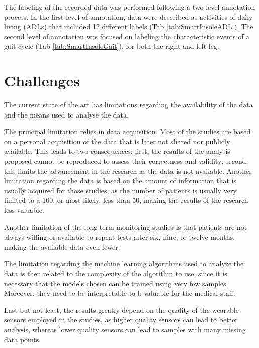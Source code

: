 The labeling of the recorded data was performed following a two-level annotation process. In the first level of annotation, data were described as activities of daily living (ADLs) that included 12 different labels (Tab \ref{tab:SmartInsoleADL}). The second level of annotation was focused on labeling the characteristic events of a gait cycle (Tab \ref{tab:SmartInsoleGait}), for both the right and left leg. 

\FloatBarrier


\FloatBarrier
\section{Challenges}
The current state of the art has limitations regarding the availability of the data and the means used to analyse the data.

The principal limitation relies in data acquisition. Most of the studies are based on a personal acquisition of the data that is later not shared nor publicly available. This leads to two consequences: first, the results of the analysis proposed cannot be reproduced to assess their correctness and validity; second, this limits the advancement in the research as the data is not available.
Another limitation regarding the data is based on the amount of information that is usually acquired for those studies, as the number of patients is usually very limited to a 100, or most likely, less than 50, making the results of the research less valuable.

Another limitation of the long term monitoring studies is that patients are not always willing or available to repeat tests after six, nine, or twelve months, making the available data even fewer. 

The limitation regarding the machine learning algorithms used to analyze the data is then related to the complexity of the algorithm to use, since it is necessary that the models chosen can be trained using very few samples. Moreover, they need to be interpretable to b valuable for the medical staff.

Last but not least, the results greatly depend on the quality of the wearable sensors employed in the studies, as higher quality sensors can lead to better analysis, whereas lower quality sensors can lead to samples with many missing data points.

